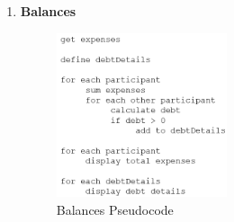 \documentclass[conference]{IEEEtran}
\begin{document}
\begin{enumerate}
\begin{enumerate}
        \end{enumerate}
    \item \textbf{Balances}
        \newline
        \begin{figure}[h!]
            \centerline{\includegraphics[width=50mm,scale=0.5]{img/pseudocode/pseudocode-balances.png}}
            \caption{Balances Pseudocode}
            \label{fig:my_label}
        \end{figure}
    \end{enumerate}
\end{document}
